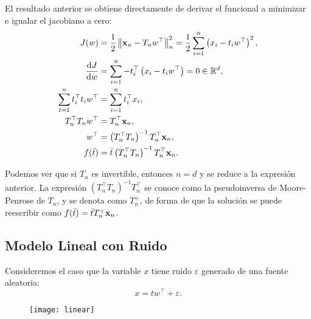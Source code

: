 El resultado anterior se obtiene directamente de derivar el funcional a minimizar e igualar el jacobiano a cero:
\begin{align*}
	J(w)									&= \frac{1}{2} \left\Vert \mathbf{x}_n - T_n w^{\top} \right\Vert_n^2 = \frac{1}{2} \sum_{i=1}^n \left(x_i - t_i w^{\top}\right)^2,\\
	\dv{J}{w}								&= \sum_{i=1}^n - t_i^{\top} \left(x_i - t_i w^{\top}\right) = 0 \in \mathbb{R}^d,\\
	\sum_{t=1}^n t_i^{\top} t_i w^{\top}	&= \sum_{i=1}^n t_i^{\top} x_i,\\
	T_n^{\top} T_n w^{\top}					&= T_n^{\top} \mathbf{x}_n,\\
	w^{\top}								&= \left(T_n^{\top} T_n\right)^{-1} T_n^{\top}\mathbf{x}_n,\\
	f(\bar{t})								&= \bar{t} \left(T_n^{\top} T_n\right)^{-1} T_n^{\top}\mathbf{x}_n.
\end{align*}


Podemos ver que si \(T_n\) es invertible, entonces \(n = d\) y se reduce a la expresión anterior. La expresión \(\left(T_n^{\top} T_n\right)^{-1} T_n^{\top}\) se conoce como la pseudoinversa de Moore-Penrose de \(T_n\), y se denota como \(T_n^+\), de forma de que la solución se puede reescribir como \(f(\bar{t}) = \bar{t} T_n^+ \mathbf{x}_n\). 

\subsection{Modelo Lineal con Ruido}
Consideremos el caso que la variable \(x\) tiene ruido \(\varepsilon\) generado de una fuente aleatoria:
\begin{equation*}
	x = t w^{\top} + \varepsilon.
\end{equation*}%

\begin{figure}[h]
	\centering
	\texttt{[image: linear]}
\end{figure}


